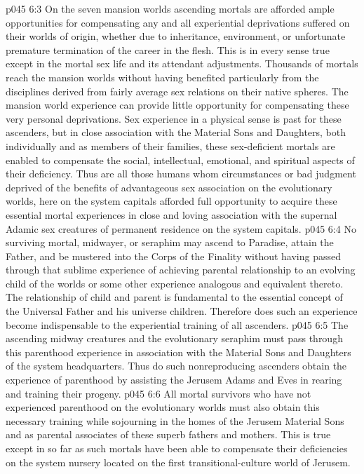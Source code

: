 \vs p045 6:3 On the seven mansion worlds ascending mortals are afforded ample opportunities for compensating any and all experiential deprivations suffered on their worlds of origin, whether due to inheritance, environment, or unfortunate premature termination of the career in the flesh. This is in every sense true except in the mortal sex life and its attendant adjustments. Thousands of mortals reach the mansion worlds without having benefited particularly from the disciplines derived from fairly average sex relations on their native spheres. The mansion world experience can provide little opportunity for compensating these very personal deprivations. Sex experience in a physical sense is past for these ascenders, but in close association with the Material Sons and Daughters, both individually and as members of their families, these sex\hyp{}deficient mortals are enabled to compensate the social, intellectual, emotional, and spiritual aspects of their deficiency. Thus are all those humans whom circumstances or bad judgment deprived of the benefits of advantageous sex association on the evolutionary worlds, here on the system capitals afforded full opportunity to acquire these essential mortal experiences in close and loving association with the supernal Adamic sex creatures of permanent residence on the system capitals.
\pc \vs p045 6:4 No surviving mortal, midwayer, or seraphim may ascend to Paradise, attain the Father, and be mustered into the Corps of the Finality without having passed through that sublime experience of achieving parental relationship to an evolving child of the worlds or some other experience analogous and equivalent thereto. The relationship of child and parent is fundamental to the essential concept of the Universal Father and his universe children. Therefore does such an experience become indispensable to the experiential training of all ascenders.
\vs p045 6:5 The ascending midway creatures and the evolutionary seraphim must pass through this parenthood experience in association with the Material Sons and Daughters of the system headquarters. Thus do such nonreproducing ascenders obtain the experience of parenthood by assisting the Jerusem Adams and Eves in rearing and training their progeny.
\vs p045 6:6 All mortal survivors who have not experienced parenthood on the evolutionary worlds must also obtain this necessary training while sojourning in the homes of the Jerusem Material Sons and as parental associates of these superb fathers and mothers. This is true except in so far as such mortals have been able to compensate their deficiencies on the system nursery located on the first transitional\hyp{}culture world of Jerusem.\plusone
